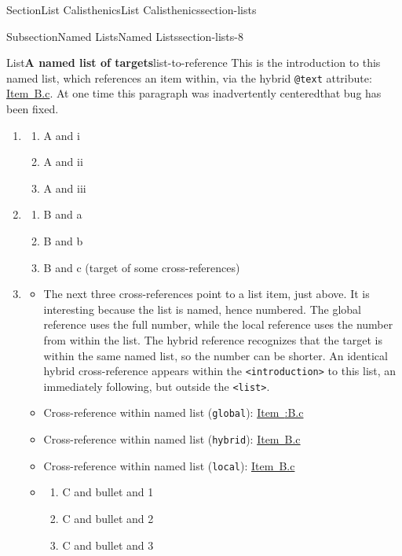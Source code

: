 \documentclass[twoside,10pt,]{article}
\newcommand{\xreffont}{\relax}
\newcommand{\mono}[1]{\texttt{#1}}
\numberwithin{equation}{section}
\begin{document}
\begin{sectionptx}{Section}{List Calisthenics}{}{List Calisthenics}{}{}{section-lists}
\begin{subsectionptx}{Subsection}{Named Lists}{}{Named Lists}{}{}{section-lists-8}
\begin{listptx}{List}{\textbf{A named list of targets}}{list-to-reference}{}%
This is the introduction to this named list, which references an item within, via the hybrid \mono{@text} attribute:  \hyperlink{target-item}{Item~B.c}.  At one time this paragraph was inadvertently centered\textemdash{}that bug has been fixed.%
%
\begin{enumerate}[label={\Alph*}]
\item{}%
\begin{enumerate}[label={\roman*}]
\item{}A and i%
\item{}A and ii%
\item{}A and iii%
\end{enumerate}
%
\item{}%
\begin{enumerate}[label={\alph*}]
\item{}B and a%
\item{}B and b%
\item\hypertarget{target-item}{}B and c (target of some cross-references)%
\end{enumerate}
%
\item{}%
\begin{itemize}[label=\textbullet]
\item{}The next three cross-references point to a list item, just above.  It is interesting because the list is named, hence numbered.  The global reference uses the full number, while the local reference uses the number from within the list.  The hybrid reference recognizes that the target is within the same named list, so the number can be shorter.  An identical hybrid cross-reference appears within the \mono{<introduction>} to this list, an immediately following, but outside the \mono{<list>}.%
\item{}Cross-reference within named list (\mono{global}): \hyperlink{target-item}{Item~{\xreffont 12.4:B.c}}%
\item{}Cross-reference within named list (\mono{hybrid}): \hyperlink{target-item}{Item~B.c}%
\item{}Cross-reference within named list (\mono{local}): \hyperlink{target-item}{Item~B.c}%
\item{}%
\begin{enumerate}[label={\arabic*}]
\item{}C and bullet and 1%
\item\hypertarget{target-no-number}{}C and bullet and 2%
\item{}C and bullet and 3%

\end{enumerate}
\end{itemize}
\end{enumerate}
\end{listptx}
\end{subsectionptx}
\end{sectionptx}
\end{document}
